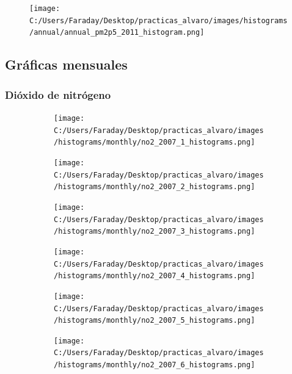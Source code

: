 \documentclass[12pt]{article}
\begin{document}
\begin{figure}[H]
\centering
\texttt{[image: C:/Users/Faraday/Desktop/practicas\_alvaro/images/histograms/annual/annual\_pm2p5\_2011\_histogram.png]}
\label{fig:hist-ann-4-5}
\caption{}
\end{figure}

\newpage

\subsection*{Gráficas mensuales}
%

\subsubsection*{Dióxido de nitrógeno}
%

\begin{figure}[H]
\centering
\begin{subfigure}[h]{0.45\textwidth}
\texttt{[image: C:/Users/Faraday/Desktop/practicas\_alvaro/images/histograms/monthly/no2\_2007\_1\_histograms.png]}
\caption{}
\label{fig:hist-mon-1-1-2007}
\end{subfigure}
%
\begin{subfigure}[H]{0.45\textwidth}
\texttt{[image: C:/Users/Faraday/Desktop/practicas\_alvaro/images/histograms/monthly/no2\_2007\_2\_histograms.png]}
\caption{}
\label{fig:hist-mon-1-2-2007}
\end{subfigure}
\caption{}
\end{figure}

\begin{figure}[H]
\centering
\begin{subfigure}[h]{0.45\textwidth}
\texttt{[image: C:/Users/Faraday/Desktop/practicas\_alvaro/images/histograms/monthly/no2\_2007\_3\_histograms.png]}
\caption{}
\label{fig:hist-mon-1-3-2007}
\end{subfigure}
%
\begin{subfigure}[H]{0.45\textwidth}
\texttt{[image: C:/Users/Faraday/Desktop/practicas\_alvaro/images/histograms/monthly/no2\_2007\_4\_histograms.png]}
\caption{}
\label{fig:hist-mon-1-4-2007}
\end{subfigure}
\caption{}
\end{figure}

\begin{figure}[H]
\centering
\begin{subfigure}[h]{0.45\textwidth}
\texttt{[image: C:/Users/Faraday/Desktop/practicas\_alvaro/images/histograms/monthly/no2\_2007\_5\_histograms.png]}
\caption{}
\label{fig:hist-mon-1-5-2007}
\end{subfigure}
%
\begin{subfigure}[H]{0.45\textwidth}
\texttt{[image: C:/Users/Faraday/Desktop/practicas\_alvaro/images/histograms/monthly/no2\_2007\_6\_histograms.png]}
\caption{}
\label{fig:hist-mon-1-6-2007}
\end{subfigure}
\caption{}
\end{figure}
\end{document}
